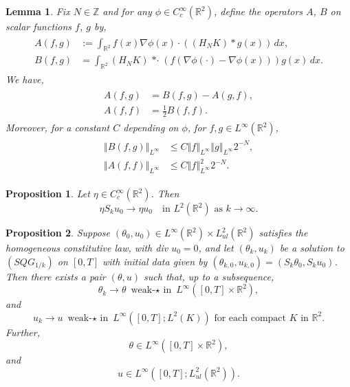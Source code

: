 \documentclass[10pt,a4paper]{amsart}
\newtheorem{lemma}{Lemma}
\newtheorem{prop}{Proposition}
\def\R{{\mathbb R}}
\def\Z{{\mathbb Z}}
\newcommand{\grad}{\ensuremath{\nabla}}
\newcommand{\iny}{\ensuremath{\infty}}
\newcommand{\norm}[1]{\ensuremath{\left\Vert #1 \right\Vert}}
\newcommand{\stardot}{{\mathop{* \cdot}}}
\begin{document}
\begin{lemma}\label{L:ffInt}
    Fix $N \in \Z$ and for any $\phi \in C_c^\iny(\R^2)$, define the operators $A$, $B$ on scalar functions $f$, $g$ by,
    \begin{align}\label{e:ABOperators}
        \begin{split}
    	A(f, g)
			&:= \int_{\R^2} f(x)
    	    \grad \phi(x) \cdot ((H_N K) * g(x)) \, dx, \\
        B(f, g)
            &= \int_{\R^2} (H_N K) \stardot (f (\grad \phi(\cdot) - \grad \phi(x)))
                    g(x) \, dx.
        \end{split}
    \end{align}
    We have,
	\begin{align}\label{e:ffIntId}
        \begin{split}
            A(f, g)
                &= B(f, g)
                    - A(g, f), \\
            A(f, f)
                &= \frac{1}{2}B(f, f).
            \end{split}
    \end{align}
    Moreover, for a constant $C$ depending on $\phi$, for $f, g \in L^\iny(\R^2)$,
	\begin{align}\label{e:ffBound}
        \begin{split}
        \norm{B(f, g)}_{L^\iny}
            &\le C \norm{f}_{L^\iny} \norm{g}_{L^\iny} 2^{-N}, \\
		\norm{A(f, f)}_{L^\iny}
			&\le C \norm{f}_{L^\iny}^2 2^{-N}.
        \end{split}
	\end{align}
\end{lemma}

\begin{prop}\label{prop:convergence-of-initial-data-u}
Let $\eta\in C^{\infty}_c(\R^2)$.  Then $$ \eta S_k u_0 \rightarrow  \eta u_0 \quad \text{in }L^2(\R^2) \text{ as }k\rightarrow\infty.$$
\end{prop}

\begin{prop}\label{prop:existence-of-limit-of-theta-u}
     Suppose $(\theta_0,u_0) \in L^{\infty}(\R^2)\times L^2_{ul}(\R^2)$ satisfies the homogeneous constitutive law, with div $u_0=0$, and let $(\theta_k,u_k)$ be a solution to $(SQG_{1/k})$ on $[0,T]$ with initial data given by $(\theta_{k,0},u_{k,0})=(S_k\theta_{0}, S_k u_{0})$. Then there exists a pair $(\theta,u)$ such that, up to a subsequence, $$\theta_k\rightarrow\theta \text{ weak-$\star$ in }L^{\infty}([0,T]\times \R^2),$$ and 
     $$u_k \rightarrow u \text{ weak-$\star$ in }L^{\infty}([0,T]; L^2(K)) \text{ for each compact $K$ in $\R^2$}.$$ Further, $$\theta \in L^\infty([0,T]\times\R^2),$$ and $$u \in L^{\infty}([0,T];L^2_{ul}(\R^2)).$$
\end{prop}
\end{document}
